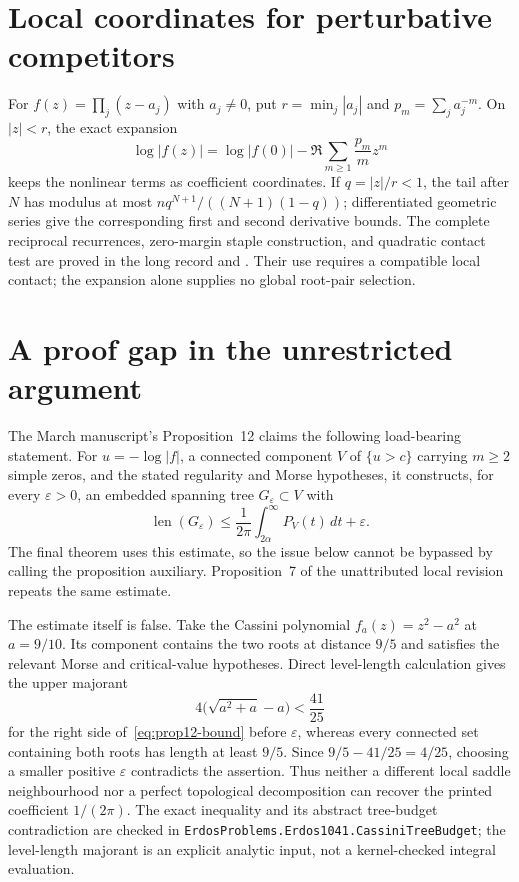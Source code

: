 \documentclass[11pt]{article}
\begin{document}
\section{Local coordinates for perturbative competitors}
\label{sec:reciprocal}

For $f(z)=\prod_j(z-a_j)$ with $a_j\ne0$, put $r=\min_j|a_j|$ and
$p_m=\sum_j a_j^{-m}$.  On $|z|<r$, the exact expansion
\[
 \log|f(z)|=\log|f(0)|-\Re\sum_{m\ge1}\frac{p_m}{m}z^m
\]
keeps the nonlinear terms as coefficient coordinates.  If $q=|z|/r<1$,
the tail after $N$ has modulus at most
$nq^{N+1}/((N+1)(1-q))$; differentiated geometric series give the
corresponding first and second derivative bounds.
The complete reciprocal recurrences, zero-margin staple construction, and
quadratic contact test are proved in the long record and
.
Their use requires a compatible local contact; the expansion alone supplies
no global root-pair selection.

\section{A proof gap in the unrestricted argument}\label{sec:gap}

The March manuscript's Proposition~12 claims the following load-bearing
statement.  For $u=-\log|f|$, a connected component $V$ of $\{u>c\}$ carrying
$m\ge2$ simple zeros, and the stated regularity and Morse hypotheses, it
constructs, for every $\varepsilon>0$, an embedded spanning tree
$G_\varepsilon\subset V$ with
\[
 \operatorname{len}(G_\varepsilon)
 \le\frac1{2\pi}\int_{2\alpha}^{\infty}P_V(t)\,dt+\varepsilon.
\tag{5.1}\label{eq:prop12-bound}
\]
The final theorem uses this estimate, so the issue below cannot be bypassed by
calling the proposition auxiliary.  Proposition~7 of the unattributed local
revision repeats the same estimate.

The estimate itself is false.  Take the Cassini polynomial
$f_a(z)=z^2-a^2$ at $a=9/10$.  Its component contains the two roots at distance
$9/5$ and satisfies the relevant Morse and critical-value hypotheses.  Direct
level-length calculation gives the upper majorant
\[
  4\bigl(\sqrt{a^2+a}-a\bigr)<\frac{41}{25}
\]
for the right side of~\eqref{eq:prop12-bound} before $\varepsilon$, whereas
every connected set containing both roots has length at least $9/5$.  Since
$9/5-41/25=4/25$, choosing a smaller positive $\varepsilon$ contradicts the
assertion.  Thus neither a different local saddle neighbourhood nor a perfect
topological decomposition can recover the printed coefficient $1/(2\pi)$.
The exact inequality and its abstract tree-budget contradiction are checked in
\texttt{ErdosProblems.Erdos1041.CassiniTreeBudget}; the level-length majorant is
an explicit analytic input, not a kernel-checked integral evaluation.
\end{document}
